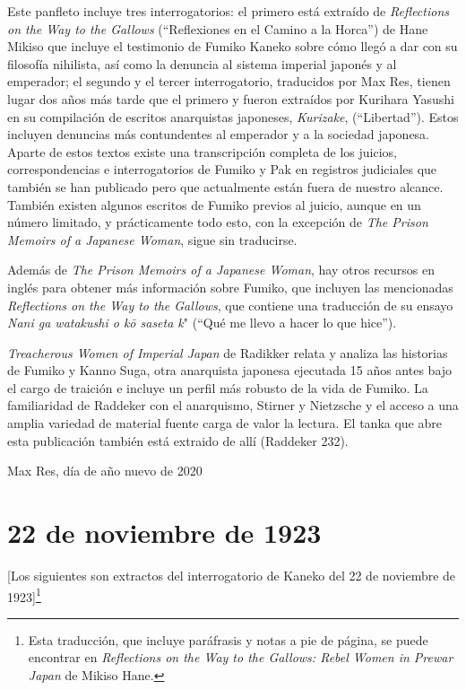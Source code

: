 \documentclass[
]{book}
\begin{document}
Este panfleto incluye tres interrogatorios: el primero está extraído de \emph{Reflections on the Way to the Gallows} (``Reflexiones en el Camino a la Horca'') de Hane Mikiso que incluye el testimonio de Fumiko Kaneko sobre cómo llegó a dar con su filosofía nihilista, así como la denuncia al sistema imperial japonés y al emperador; el segundo y el tercer interrogatorio, traducidos por Max Res, tienen lugar dos años más tarde que el primero y fueron extraídos por Kurihara Yasushi en su compilación de escritos anarquistas japoneses, \emph{Kurizake}, (``Libertad''). Estos incluyen denuncias más contundentes al emperador y a la sociedad japonesa. Aparte de estos textos existe una transcripción completa de los juicios, correspondencias e interrogatorios de Fumiko y Pak en registros judiciales que también se han publicado pero que actualmente están fuera de nuestro alcance. También existen algunos escritos de Fumiko previos al juicio, aunque en un número limitado, y prácticamente todo esto, con la excepción de \emph{The Prison Memoirs of a Japanese Woman}, sigue sin traducirse.

Además de \emph{The Prison Memoirs of a Japanese Woman}, hay otros recursos en inglés para obtener más información sobre Fumiko, que incluyen las mencionadas \emph{Reflections on the Way to the Gallows}, que contiene una traducción de su ensayo \emph{Nani ga watakushi o kō saseta k}" (``Qué me llevo a hacer lo que hice'').

\emph{Treacherous Women of Imperial Japan} de Radikker relata y analiza las historias de Fumiko y Kanno Suga, otra anarquista japonesa ejecutada 15 años antes bajo el cargo de traición e incluye un perfil más robusto de la vida de Fumiko. La familiaridad de Raddeker con el anarquismo, Stirner y Nietzsche y el acceso a una amplia variedad de material fuente carga de valor la lectura. El tanka que abre esta publicación también está extraido de allí (Raddeker 232).

Max Res, día de año nuevo de 2020

\hypertarget{de-noviembre-de-1923}{%
\chapter*{22 de noviembre de 1923}\label{de-noviembre-de-1923}}

{[}Los siguientes son extractos del interrogatorio de Kaneko del 22 de noviembre de 1923{]}\footnote{Esta traducción, que incluye paráfrasis y notas a pie de página, se puede encontrar en \emph{Reflections on the Way to the Gallows: Rebel Women in Prewar Japan} de Mikiso Hane.}
\end{document}
